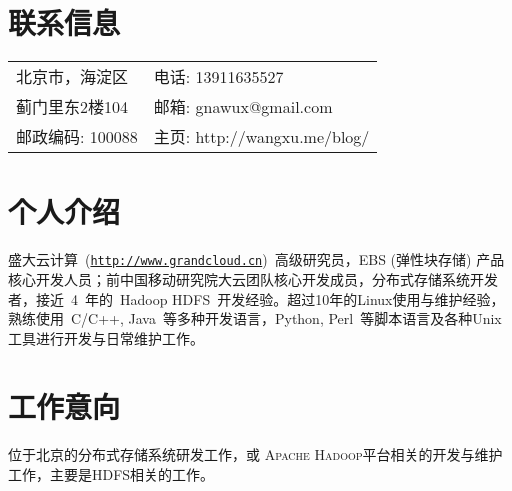 \documentclass[margin,line]{res}
\newcommand{\http}{http:/\hspace{-0.3ex}/}
\begin{document}

\begin{resume}
\section{联系信息}
\vspace{.05in}
\begin{tabular}{@{}p{2in}|p{3in}}
北京市，海淀区 	   & \textsf{电话:} {13911635527}\\         
蓟门里东2楼104     & \textsf{邮箱:} {gnawux@gmail.com}\\       
邮政编码: 100088   & \textsf{主页:} {\http{}wangxu.me/blog/}\\
\end{tabular}

\section{个人介绍}

盛大云计算~(\href{http://www.grandcloud.cn}{\tt \http{}www.grandcloud.cn})~高级研究员，EBS (弹性块存储) 产品核心开发人员；前中国移动研究院大云团队核心开发成员，分布式存储系统开发者，接近~4~年的~Hadoop HDFS~开发经验。超过10年的Linux使用与维护经验，熟练使用~C/C++, Java~等多种开发语言，Python, Perl~等脚本语言及各种Unix工具进行开发与日常维护工作。 

\section{工作意向}

位于北京的分布式存储系统研发工作，或\textsc{ Apache Hadoop}平台相关的开发与维护工作，主要是HDFS相关的工作。


\end{resume}
\end{document}
